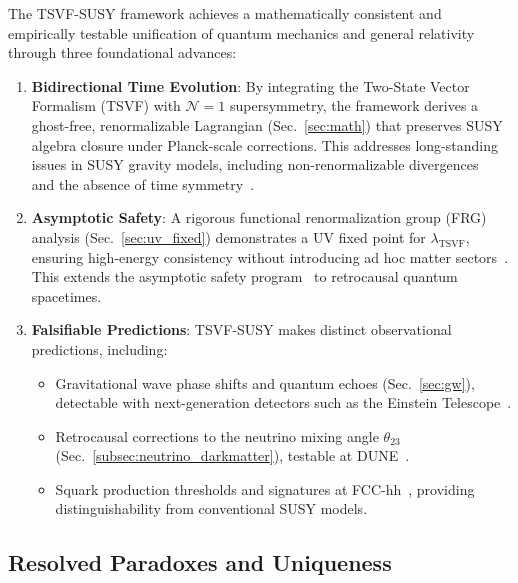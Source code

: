 \documentclass[twocolumn,superscriptaddress,floatfix]{revtex4-2}
\begin{document}
The TSVF-SUSY framework achieves a mathematically consistent and empirically testable unification of quantum mechanics and general relativity through three foundational advances:

\begin{enumerate}
    \item \textbf{Bidirectional Time Evolution}: By integrating the Two-State Vector Formalism (TSVF) with \(\mathcal{N}=1\) supersymmetry, the framework derives a ghost-free, renormalizable Lagrangian (Sec.~\ref{sec:math}) that preserves SUSY algebra closure under Planck-scale corrections. This addresses long-standing issues in SUSY gravity models, including non-renormalizable divergences~\cite{Nicolai1984} and the absence of time symmetry~\cite{Page1994}.
    
    \item \textbf{Asymptotic Safety}: A rigorous functional renormalization group (FRG) analysis (Sec.~\ref{sec:uv_fixed}) demonstrates a UV fixed point for \(\lambda_{\text{TSVF}}\), ensuring high-energy consistency without introducing ad hoc matter sectors~\cite{Niedermaier2006}. This extends the asymptotic safety program~\cite{Reuter1998} to retrocausal quantum spacetimes.
    
    \item \textbf{Falsifiable Predictions}: TSVF-SUSY makes distinct observational predictions, including:
    \begin{itemize}
        \item Gravitational wave phase shifts and quantum echoes (Sec.~\ref{sec:gw}), detectable with next-generation detectors such as the Einstein Telescope~\cite{Punturo2010}.
        \item Retrocausal corrections to the neutrino mixing angle \(\theta_{23}\) (Sec.~\ref{subsec:neutrino_darkmatter}), testable at DUNE~\cite{Abi2021}.
        \item Squark production thresholds and signatures at FCC-hh~\cite{Abada2019}, providing distinguishability from conventional SUSY models.
    \end{itemize}
\end{enumerate}

\subsection{Resolved Paradoxes and Uniqueness}
\label{subsec:resolved_paradoxes}
\end{document}
